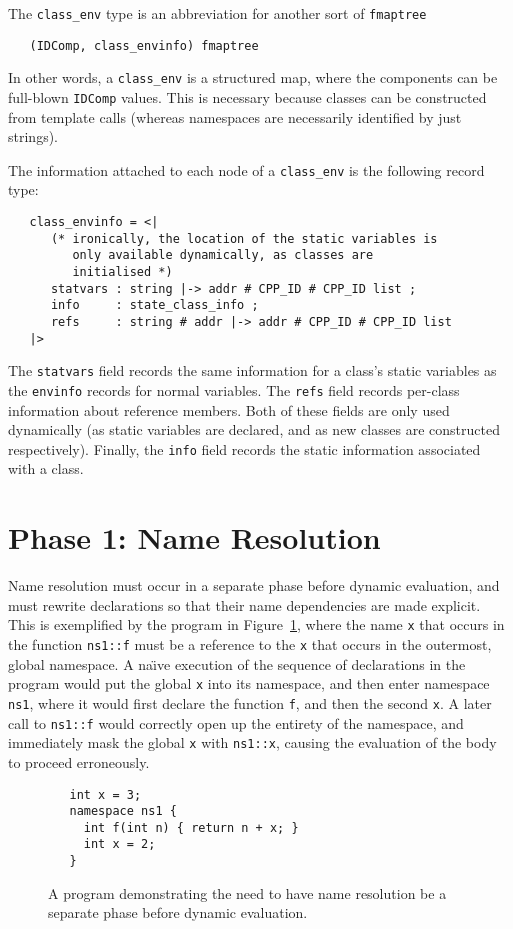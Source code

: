 \documentclass[11pt]{article}
\newcommand{\naive}{na\"\i{}ve}
\begin{document}
The \texttt{class_env} type is an abbreviation for another sort of
\texttt{fmaptree}
\begin{verbatim}
   (IDComp, class_envinfo) fmaptree
\end{verbatim}
In other words, a \texttt{class_env} is a structured map, where the
components can be full-blown \texttt{IDComp} values.  This is
necessary because classes can be constructed from template calls
(whereas namespaces are necessarily identified by just strings).

The information attached to each node of a \texttt{class_env} is the
following record type:
\begin{verbatim}
   class_envinfo = <|
      (* ironically, the location of the static variables is
         only available dynamically, as classes are
         initialised *)
      statvars : string |-> addr # CPP_ID # CPP_ID list ;
      info     : state_class_info ;
      refs     : string # addr |-> addr # CPP_ID # CPP_ID list
   |>
\end{verbatim}
The \texttt{statvars} field records the same information for a class's
static variables as the \texttt{envinfo} records for normal
variables.  The \texttt{refs} field records per-class information
about reference members.  Both of these fields are only used
dynamically (as static variables are declared, and as new classes are
constructed respectively).  Finally, the \texttt{info} field records
the static information associated with a class.



\section{Phase 1: Name Resolution}
\label{sec:phase1}

Name resolution must occur in a separate phase before dynamic
evaluation, and must rewrite declarations so that their name
dependencies are made explicit.  This is exemplified by the program in
Figure~\ref{fig:name-res-separate-phase}, where the name \texttt{x}
that occurs in the function \texttt{ns1::f} must be a reference to the
\texttt{x} that occurs in the outermost, global namespace.  A \naive{}
execution of the sequence of declarations in the program would put the
global \texttt{x} into its namespace, and then enter namespace
\texttt{ns1}, where it would first declare the function \texttt{f},
and then the second \texttt{x}.  A later call to \texttt{ns1::f} would
correctly open up the entirety of the namespace, and immediately mask
the global \texttt{x} with \texttt{ns1::x}, causing the evaluation of
the body to proceed erroneously.
\begin{figure}[htbp]
\begin{verbatim}
   int x = 3;
   namespace ns1 {
     int f(int n) { return n + x; }
     int x = 2;
   }
\end{verbatim}
  \caption[A Program Requiring Name Resolution]{A program
    demonstrating the need to have name resolution be a separate phase
    before dynamic evaluation.}
\label{fig:name-res-separate-phase}
\end{figure}
\end{document}
